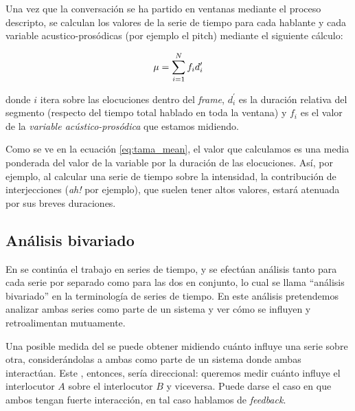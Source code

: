 Una vez que la conversación se ha partido en ventanas mediante el proceso descripto, se calculan los valores de la serie de tiempo para cada hablante y cada variable acustico-prosódicas (por ejemplo el pitch) mediante el siguiente cálculo:

\begin{equation}
    \mu = \sum\limits_{i=1}^N f_i d_i^\prime \label{eq:tama_mean}\\
\end{equation}

\noindent donde $i$ itera sobre las elocuciones dentro del \emph{frame}, $d_i^\prime$ es la duración relativa del segmento (respecto del tiempo total hablado en toda la ventana) y $f_i$ es el valor de la \emph{variable acústico-prosódica} que estamos midiendo.

Como se ve en la ecuación \ref{eq:tama_mean}, el valor que calculamos es una media ponderada del valor de la variable por la duración de las elocuciones. Así, por ejemplo, al calcular una serie de tiempo sobre la intensidad, la contribución de interjecciones (\emph{ah!} por ejemplo), que suelen tener altos valores, estará atenuada por sus breves duraciones.

\subsection{Análisis bivariado}
\label{sec:analisis_bivariado}

\newcommand{\squarederr}[1]{
    \sum\limits_{t=1}^n \varnorm{#1}^2
}

\newcommand{\crosscorr}[2]{
  \frac{\sum\limits_{t=|k|+1}^n \varnorm{#1} (#2_{t-k} - \mu_{#2})}{
    \sqrt{\squarederr{#1} \squarederr{#2}}
  } \\
}

\newcommand{\corrdenom}{\sqrt{\squarederr{A}\squarederr{B}}}

En \cite{KOU2008.2} se continúa el trabajo en series de tiempo, y se efectúan análisis tanto para cada serie por separado como para las dos en conjunto, lo cual se llama ``análisis bivariado'' en la terminología de series de tiempo. En este análisis pretendemos analizar ambas series como parte de un sistema y ver cómo se influyen y retroalimentan mutuamente.

Una posible medida del \entrainment se puede obtener midiendo cuánto influye una serie sobre otra, considerándolas a ambas como parte de un sistema donde ambas interactúan. Este \entrainment, entonces, sería direccional: queremos medir cuánto influye el interlocutor $A$ sobre el interlocutor $B$ y viceversa. Puede darse el caso en que ambos tengan fuerte interacción, en tal caso hablamos de \emph{feedback}.

